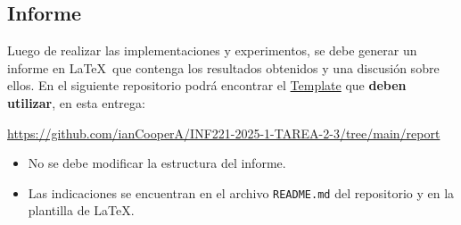 \subsection{Informe} \label{subsec:report}

Luego de realizar las implementaciones y experimentos, se debe generar un informe en \LaTeX\ que contenga los resultados obtenidos y una discusión sobre ellos. En el siguiente repositorio podrá encontrar el \href{https://github.com/ianCooperA/INF221-2025-1-TAREA-2-3/tree/main/report}{Template} que \textbf{deben utilizar}, en esta entrega:

\begin{mdframed}

\begin{center}
    
    \url{https://github.com/ianCooperA/INF221-2025-1-TAREA-2-3/tree/main/report}
        
\end{center}
\end{mdframed}

\begin{itemize}
    \item No se debe modificar la estructura del informe.
    \item Las indicaciones se encuentran en el archivo \texttt{README.md} del repositorio y en la plantilla de \LaTeX. 
\end{itemize}

